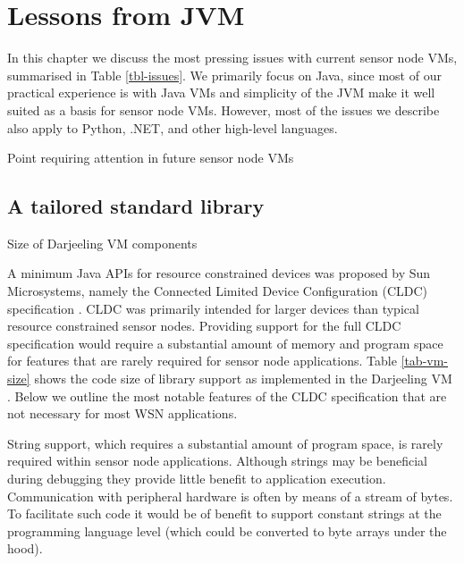\chapter{Lessons from JVM}
In this chapter we discuss the most pressing issues with current sensor node VMs, summarised in Table \ref{tbl-issues}. We primarily focus on Java, since most of our practical experience is with Java VMs and simplicity of the JVM make it well suited as a basis for sensor node VMs. However, most of the issues we describe also apply to Python, .NET, and other high-level languages.

\begin{table*}
    \centering
    \caption{Point requiring attention in future sensor node VMs}
    \scriptsize
    \label{tbl-issues}
    
\end{table*}


\section{A tailored standard library}
\label{sec-std-lib}
\begin{table*}
    \centering
    \caption{Size of Darjeeling VM components}
    \scriptsize
    \label{tab-vm-size}
     
\end{table*}

A minimum Java APIs for resource constrained devices was proposed by Sun Microsystems, namely the Connected Limited Device Configuration (CLDC) specification \cite{CLDC}.  CLDC was primarily intended for larger devices than typical resource constrained sensor nodes.  Providing support for the full CLDC specification would require a substantial amount of memory and program space for features that are rarely required for sensor node applications. Table \ref{tab-vm-size} shows the code size of library support as implemented in the Darjeeling VM \cite{Brouwers:2009cj}.  Below we outline the most notable features of the CLDC specification that are not necessary for most WSN applications.

String support, which requires a substantial amount of program space, is rarely required within sensor node applications. Although strings may be beneficial during debugging they provide little benefit to application execution. Communication with peripheral hardware is often by means of a stream of bytes. To facilitate such code it would be of benefit to support constant strings at the programming language level (which could be converted to byte arrays under the hood).

